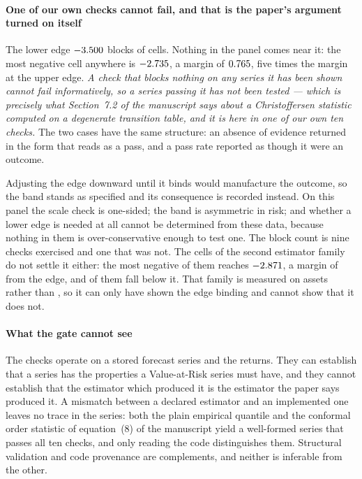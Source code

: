 \documentclass[preprint,11pt,authoryear]{elsarticle}
\newcommand{\1}{\boldsymbol{1}}
\begin{document}
\paragraph{One of our own checks cannot fail, and that is the paper's argument
turned on itself} The lower edge $-3.500$ blocks
\nGapCellsLowerBlocks{} of \nGapCellsTotal{} cells. Nothing in the panel comes
near it: the most negative cell anywhere is $-2.735$, a margin of
$0.765$, five times the margin at the upper edge. \emph{A check that
blocks nothing on any series it has been shown cannot fail informatively, so a
series passing it has not been tested --- which is precisely what
Section~7.2 of the manuscript says about a Christoffersen statistic computed on
a degenerate transition table, and it is here in one of our own ten checks.} The
two cases have the same structure: an absence of evidence returned in the form
that reads as a pass, and a pass rate reported as though it were an outcome.

Adjusting the edge downward until it binds would manufacture the outcome, so the
band stands as specified and its consequence is recorded instead. On this panel
the scale check is one-sided; the band is asymmetric in risk; and whether a lower
edge is needed at all cannot be determined from these data, because nothing in
them is over-conservative enough to test one. The block count is nine checks
exercised and one that was not. The \nMLCells{} cells of the second estimator
family do not settle it either: the most negative of them reaches
$-2.871$, a margin of \nMLLowerEdgeMargin{} from the edge, and
\nMLBelowLowerEdge{} of them fall below it. That family is measured on
\nMLAssets{} assets rather than \nMainAssets, so it can only have shown the edge
binding and cannot show that it does not.

\paragraph{What the gate cannot see} The checks operate on a stored forecast
series and the returns. They can establish that a series has the properties a
Value-at-Risk series must have, and they cannot establish that the estimator
which produced it is the estimator the paper says produced it. A mismatch between
a declared estimator and an implemented one leaves no trace in the series: both
the plain empirical quantile and the conformal order statistic of
equation~(8) of the manuscript yield a well-formed series that passes all ten checks, and
only reading the code distinguishes them. Structural validation and code
provenance are complements, and neither is inferable from the other.
\end{document}
